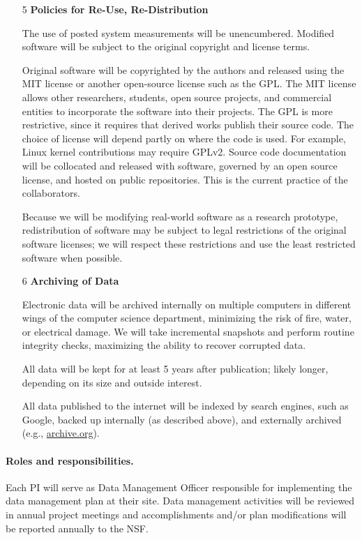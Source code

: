 \begin{enumerate}
\item [5] {\bf Policies for Re-Use, Re-Distribution}

The use of posted system measurements will be unencumbered.
Modified software will be subject to the original copyright and license terms.

Original software will be copyrighted by the authors and released
using the MIT license or another open-source license such as the
GPL\@.  The MIT license allows other researchers, students, open
source projects, and commercial entities to incorporate the software
into their projects.  The GPL is more restrictive, since it requires
that derived works publish their source code.  The choice of license
will depend partly on where the code is used.  For example, Linux
kernel contributions may require GPLv2. Source code documentation will
be collocated and released with software, governed by an open source
license, and hosted on public repositories. This is the current
practice of the collaborators.

Because we will be modifying real-world software as a research prototype,
redistribution of software may be subject to legal restrictions
of the original software licenses; we will respect these restrictions and
use the least restricted software when possible.


\item [6] {\bf Archiving of Data}

Electronic data will be archived internally on multiple computers
in different wings of the computer science department,
minimizing the risk of fire, water, or electrical damage.
We will take incremental snapshots and perform routine integrity checks,
maximizing the ability to recover corrupted data.

All data will be kept for at least 5 years after publication; likely longer,
depending on its size and outside interest.

All data published to the internet will be indexed by search engines, such as Google,
backed up internally (as described above),
and externally archived (e.g., \url{archive.org}).

\end{enumerate}

\paragraph*{Roles and responsibilities.}
Each PI %
will serve as Data Management
Officer responsible for implementing the data management plan at their
site. Data management activities will be reviewed in annual project
meetings and accomplishments and/or plan modifications will be
reported annually to the NSF.

